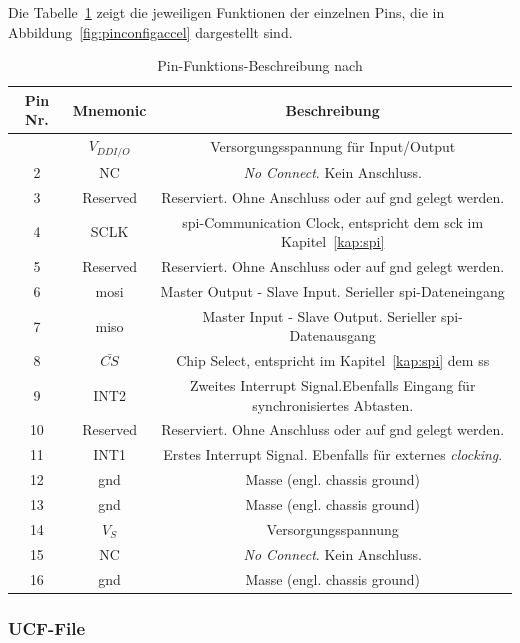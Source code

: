 Die Tabelle~\ref{tab:pinconfigaccel} zeigt die jeweiligen Funktionen der einzelnen Pins, die in Abbildung~\ref{fig:pinconfigaccel}
dargestellt sind.

\begin{table}[h]
\centering
\scriptsize
\begin{tabular}{c|c|c}
\toprule
\multicolumn{1}{c|}{\textbf{Pin Nr.}} &  \multicolumn{1}{c|}{\textbf{Mnemonic}} & \multicolumn{1}{c}{\textbf{Beschreibung}} \\
\midrule
\centering
1 & \(V_{DD I/O}\) & Versorgungsspannung für Input/Output\\
\hline
2 & NC & \emph{No Connect}. Kein Anschluss.\\
\hline
3 & Reserved & Reserviert. Ohne Anschluss oder auf \ac{gnd} gelegt werden.\\
\hline
4 & SCLK & \ac{spi}-Communication Clock, entspricht dem \ac{sck} im Kapitel~\ref{kap:spi}\\
\hline
5 & Reserved & Reserviert. Ohne Anschluss oder auf \ac{gnd} gelegt werden.\\
\hline
6 & \ac{mosi} & Master Output - Slave Input. Serieller \ac{spi}-Dateneingang\\
\hline
7 & \ac{miso} & Master Input - Slave Output. Serieller \ac{spi}-Datenausgang\\
\hline
8 & \(\bar{CS}\) & Chip Select, entspricht im Kapitel~\ref{kap:spi} dem \ac{ss}\\
\hline
9 & INT2 & Zweites Interrupt Signal.Ebenfalls Eingang für synchronisiertes Abtasten. \\
\hline
10 & Reserved & Reserviert. Ohne Anschluss oder auf \ac{gnd} gelegt werden.\\
\hline
11 & INT1 & Erstes Interrupt Signal. Ebenfalls für externes \emph{clocking}. \\
\hline
12 & \ac{gnd} & Masse (engl. chassis ground)\\
\hline
13 & \ac{gnd} & Masse (engl. chassis ground)\\
\hline
14 & \(V_{S}\) & Versorgungsspannung\\
\hline
15 & NC & \emph{No Connect}. Kein Anschluss.\\
\hline
16 & \ac{gnd} & Masse (engl. chassis ground)\\
\bottomrule
\end{tabular}
\caption{Pin-Funktions-Beschreibung nach \cite{accelerometer}}
\label{tab:pinconfigaccel}
\end{table}


\subsubsection{UCF-File}\label{kap:ucf}


